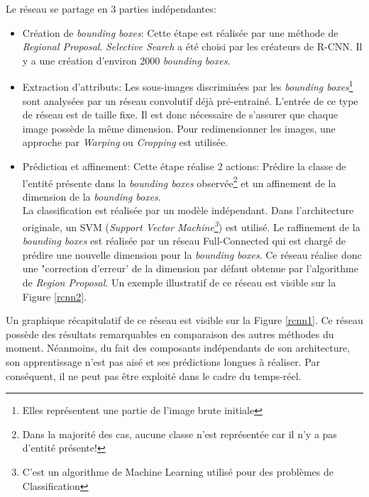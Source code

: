 \noindent Le réseau se partage en 3 parties indépendantes:
\begin{itemize}
    \item Création de \textit{bounding boxes}: Cette étape est réalisée par une méthode de \textit{Regional Proposal}. \textit{Selective Search} a été choisi par les créateurs de R-CNN. Il y a une création d'environ 2000 \textit{bounding boxes}.

    \item Extraction d'attributs: Les sous-images discriminées par les \textit{bounding boxes}\footnote{Elles représentent une partie de l'image brute initiale} sont analysées par un réseau convolutif déjà pré-entrainé. L'entrée de ce type de réseau est de taille fixe. Il est donc nécessaire de s'assurer que chaque image possède la même dimension. Pour redimensionner les images, une approche par \textit{Warping} ou \textit{Cropping} est utilisée.

    \item Prédiction et affinement: Cette étape réalise 2 actions: Prédire la classe de l'entité présente dans la \textit{bounding boxes} observée\footnote{Dans la majorité des cas, aucune classe n'est représentée car il n'y a pas d'entité présente!} et un affinement de la dimension de la \textit{bounding boxes}.\\

    La classification est réalisée par un modèle indépendant. Dans l'architecture originale, un SVM (\textit{Support Vector Machine\footnote{C'est un algorithme de Machine Learning utilisé pour des problèmes de Classification}}) est utilisé. Le raffinement de la \textit{bounding boxes} est réalisée par un réseau Full-Connected qui est chargé de prédire une nouvelle dimension pour la \textit{bounding boxes}. Ce réseau réalise donc une "correction d'erreur' de la dimension par défaut obtenue par l'algorithme de \textit{Region Proposal}. Un exemple illustratif de ce réseau est visible sur la Figure \ref{rcnn2}.

\end{itemize}

\noindent Un graphique récapitulatif de ce réseau est visible sur la Figure \ref{rcnn1}. Ce réseau possède des résultats remarquables en comparaison des autres méthodes du moment. Néanmoins, du fait des composants indépendants de son architecture, son apprentissage n'est pas aisé et ses prédictions longues à réaliser. Par conséquent, il ne peut pas être exploité dans le cadre du temps-réel.

